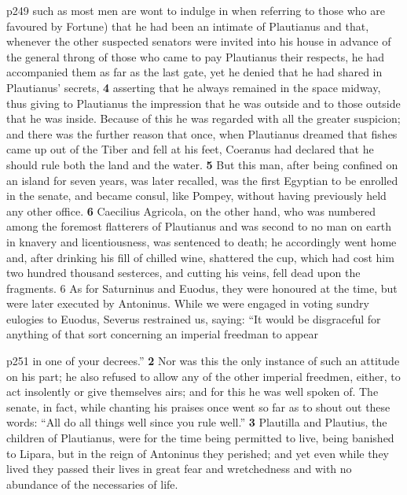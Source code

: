 p249 such as most men are wont to indulge in when referring to those who are favoured by Fortune) that he had been an intimate of Plautianus and that, whenever the other suspected senators were invited into his house in advance of the general throng of those who came to pay Plautianus their respects, he had accompanied them as far as the last gate, yet he denied that he had shared in Plautianus' secrets, \textbf{4} asserting that he always remained in the space midway, thus giving to Plautianus the impression that he was outside and to those outside that he was inside. Because of this he was regarded with all the greater suspicion; and there was the further reason that once, when Plautianus dreamed that fishes came up out of the Tiber and fell at his feet, Coeranus had declared that he should rule both the land and the water. \textbf{5} But this man, after being confined on an island for seven years, was later recalled, was the first Egyptian to be enrolled in the senate, and became consul, like Pompey, without having previously held any other office. \textbf{6} Caecilius Agricola, on the other hand, who was numbered among the foremost flatterers of Plautianus and was second to no man on earth in knavery and licentiousness, was sentenced to death; he accordingly went home and, after drinking his fill of chilled wine, shattered the cup, which had cost him two hundred thousand sesterces, and cutting his veins, fell dead upon the fragments. 6 As for Saturninus and Euodus, they were honoured at the time, but were later executed by Antoninus. While we were engaged in voting sundry eulogies to Euodus, Severus restrained us, saying: ``It would be disgraceful for anything of that sort concerning an imperial freedman to appear

p251 in one of your decrees.'' \textbf{2} Nor was this the only instance of such an attitude on his part; he also refused to allow any of the other imperial freedmen, either, to act insolently or give themselves airs; and for this he was well spoken of. The senate, in fact, while chanting his praises once went so far as to shout out these words: ``All do all things well since you rule well.'' \textbf{3} Plautilla and Plautius, the children of Plautianus, were for the time being permitted to live, being banished to Lipara, but in the reign of Antoninus they perished; and yet even while they lived they passed their lives in great fear and wretchedness and with no abundance of the necessaries of life.

